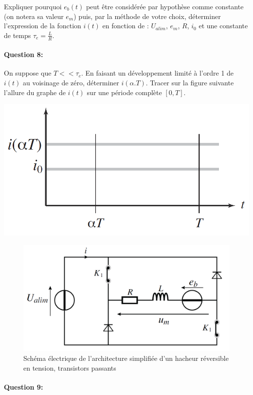 Expliquer pourquoi $e_b(t)$ peut être considérée par hypothèse comme constante (on notera sa valeur $e_m$) puis, par la méthode de votre choix, déterminer l'expression de la fonction $i(t)$ en fonction de : $U_{alim}$, $e_m$, $R$, $i_0$ et une constante de temps $\tau_e=\frac{L}{R}$.

\paragraph{Question 8:}

On suppose que $T<<\tau_e$. En faisant un développement limité à l'ordre 1 de $i(t)$ au voisinage de zéro, déterminer $i(\alpha.T)$. Tracer sur la figure suivante l'allure du graphe de $i(t)$ sur une période complète $[0, T]$.

\begin{center}
 \includegraphics[width=0.8\linewidth]{img/td02_13}
\end{center}


\begin{figure}[!h]
 \centering \includegraphics[width=0.8\linewidth]{img/td02_09}
 \caption{Schéma électrique de l'architecture simplifiée d'un hacheur réversible en tension, transistors passants}
 \label{td02_09}
\end{figure}

\paragraph{Question 9:}

